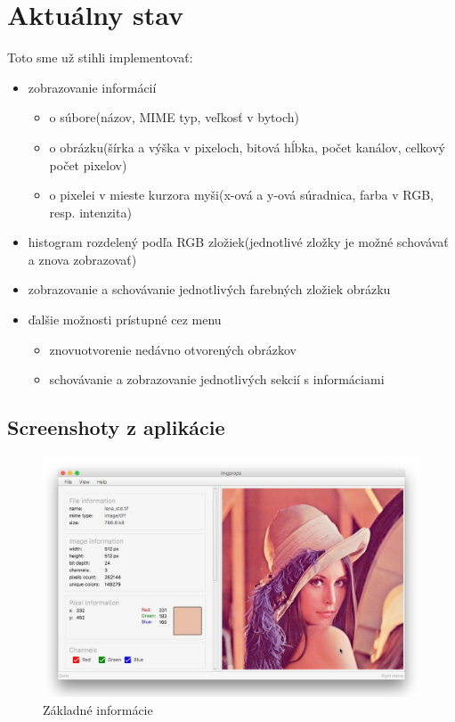 \documentclass[12pt,a4paper,titlepage,final]{article}
\begin{document}
\section{Aktuálny stav}
Toto sme už stihli implementovať:
\begin{itemize}
	\item zobrazovanie informácií
		\begin{itemize}
			\item o súbore(názov, MIME typ, veľkosť v bytoch)
			\item o obrázku(šírka a výška v pixeloch, bitová hĺbka, počet kanálov, celkový počet pixelov)
			\item o pixelei v mieste kurzora myši(x-ová a y-ová súradnica, farba v RGB, resp. intenzita)
		\end{itemize}
	\item histogram rozdelený podľa RGB zložiek(jednotlivé zložky je možné schovávať a znova zobrazovať)
	\item zobrazovanie a schovávanie jednotlivých farebných zložiek obrázku
	\item ďalšie možnosti prístupné cez menu
		\begin{itemize}
		\item znovuotvorenie nedávno otvorených obrázkov
		\item schovávanie a zobrazovanie jednotlivých sekcií s informáciami 
		\end{itemize}
	
\end{itemize}
\subsection{Screenshoty z aplikácie}
\begin{figure}[!h]
	\centering
	\includegraphics[width=15cm]{img/screenshot1.jpeg}
	\caption{Základné informácie}
\end{figure}
\end{document}

